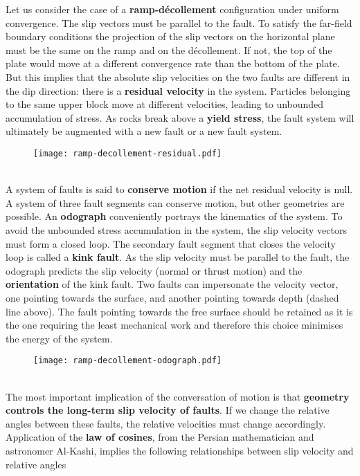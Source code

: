 \documentclass[letterpaper,12pt,]{memoir}
\begin{document}
Let us consider the case of a \textbf{ramp-d\'{e}collement} configuration under uniform convergence. The slip vectors must be parallel to the fault. To satisfy the far-field boundary conditions the projection of the slip vectors on the horizontal plane must be the same on the ramp and on the d\'{e}collement. If not, the top of the plate would move at a different convergence rate than the bottom of the plate. But this implies that the absolute slip velocities on the two faults are different in the dip direction: there is a \textbf{residual velocity} in the system. Particles belonging to the same upper block move at different velocities, leading to unbounded accumulation of stress. As rocks break above a \textbf{yield stress}, the fault system will ultimately be augmented with a new fault or a new fault system.\\
%
\begin{figure}[h]
\texttt{[image: ramp-decollement-residual.pdf]}
\end{figure}
%
\\
A system of faults is said to \textbf{conserve motion} if the net residual velocity is null. A system of three fault segments can conserve motion, but other geometries are possible. An \textbf{odograph} conveniently portrays the kinematics of the system. To avoid the unbounded stress accumulation in the system, the slip velocity vectors must form a closed loop. The secondary fault segment that closes the velocity loop is called a \textbf{kink fault}. As the slip velocity must be parallel to the fault, the odograph predicts the slip velocity (normal or thrust motion) and the \textbf{orientation} of the kink fault. Two faults can impersonate the velocity vector, one pointing towards the surface, and another pointing towards depth (dashed line above). The fault pointing towards the free surface should be retained as it is the one requiring the least mechanical work and therefore this choice minimises the energy of the system.\\
%
\begin{figure}
\texttt{[image: ramp-decollement-odograph.pdf]}
\end{figure}
%
\\
The most important implication of the conversation of motion is that \textbf{geometry controls the long-term slip velocity of faults}. If we change the relative angles between these faults, the relative velocities must change accordingly. Application of the \textbf{law of cosines}, from the Persian mathematician and astronomer Al-Kashi, implies the following relationships between slip velocity and relative angles\\
\end{document}
